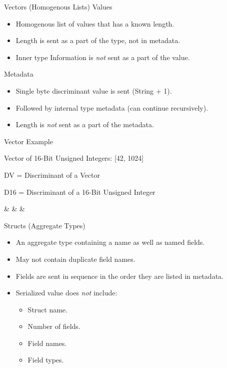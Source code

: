 \documentclass{beamer}
\newcommand{\rot}[1]{\rotatebox{90}{#1}}
\begin{document}
\begin{frame}{Vectors (Homogenous Lists)}
	Values
	\begin{itemize}
		\item Homogenous list of values that has a known length.
		\item Length is sent as a part of the type, not in metadata.
		\item Inner type Information is \emph{not} sent as a part of the value.
	\end{itemize}

	Metadata
	\begin{itemize}
		\item Single byte discriminant value is sent (String + 1).
		\item Followed by internal type metadata (can continue recursively).
		\item Length is \emph{not} sent as a part of the metadata.
	\end{itemize}
\end{frame}

\begin{frame}[fragile]{Vector Example}
	\begin{center}
		Vector of 16-Bit Unsigned Integers: [42, 1024] \vfill \break

		DV = Discriminant of a Vector

		D16 = Discriminant of a 16-Bit Unsigned Integer \vfill \break

		\begin{bytefield}{26}
			\bitbox{2}{\rot{DV}} & \bitbox{2}{\rot{D16}} &  &  \\
		\end{bytefield}
	\end{center}
\end{frame}

\begin{frame}{Structs (Aggregate Types)}
	\begin{itemize}
		\item	An aggregate type containing a name as well as named fields.
		\item May not contain duplicate field names.
		\item Fields are sent in sequence in the order they are listed in metadata.
		\item Serialized value does \emph{not} include:
		      \begin{itemize}
			      \item Struct name.
			      \item Number of fields.
			      \item Field names.
			      \item Field types.
		      \end{itemize}
	\end{itemize}
\end{frame}
\end{document}
